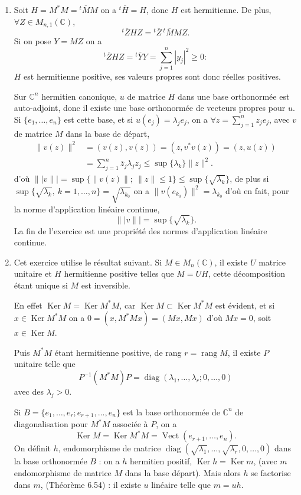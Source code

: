 \begin{enumerate}[label=\arabic*.,leftmargin=2.2em,itemsep=1.15em]
\item Soit $H=M^*M={}^t\!\overline M M$ on a ${}^t\!\overline H=H$, donc $H$ est hermitienne. De plus, $\forall Z\in M_{n,1}(\mathbb C)$,
\[
{}^t\!\overline ZHZ={}^t\!\overline Z\,{}^t\!\overline M MZ.
\]
Si on pose $Y=MZ$ on a
\[
{}^t\!\overline ZHZ={}^t\!\overline YY=\sum_{j=1}^n|y_j|^2\ge0 :
\]
$H$ est hermitienne positive, ses valeurs propres sont donc réelles positives.

Sur $\mathbb C^n$ hermitien canonique, $u$ de matrice $H$ dans une base orthonormée est auto-adjoint, donc il existe une base orthonormée de vecteurs propres pour $u$. Si $\{e_1,\ldots,e_n\}$ est cette base, et si $u(e_j)=\lambda_je_j$, on a $\forall z=\sum_{j=1}^nz_je_j$, avec $v$ de matrice $M$ dans la base de départ,
\[
\begin{aligned}
\|v(z)\|^2&=(v(z),v(z))=(z,v^*v(z))=(z,u(z))\\
&=\sum_{j=1}^n\overline z_j\lambda_jz_j
\le \sup\{\lambda_k\}\|z\|^2.
\end{aligned}
\]
d'où $\|\!|v\|\!|=\sup\{\|v(z)\|;\ \|z\|\le1\}\le\sup\{\sqrt{\lambda_k}\}$, de plus si $\sup\{\sqrt{\lambda_k},\ k=1,\ldots,n\}=\sqrt{\lambda_{k_0}}$ on a $\|v(e_{k_0})\|^2=\lambda_{k_0}$ d'où en fait, pour la norme d'application linéaire continue,
\[
\|\!|v\|\!|=\sup\{\sqrt{\lambda_k}\}.
\]
La fin de l'exercice est une propriété des normes d'application linéaire continue.

\item Cet exercice utilise le résultat suivant. Si $M\in M_n(\mathbb C)$, il existe $U$ matrice unitaire et $H$ hermitienne positive telles que $M=UH$, cette décomposition étant unique si $M$ est inversible.

En effet $\operatorname{Ker}M=\operatorname{Ker}M^*M$, car $\operatorname{Ker}M\subset\operatorname{Ker}M^*M$ est évident, et si $x\in\operatorname{Ker}M^*M$ on a $0=(x,M^*Mx)=(Mx,Mx)$ d'où $Mx=0$, soit $x\in\operatorname{Ker}M$.

Puis $M^*M$ étant hermitienne positive, de rang $r=\operatorname{rang}M$, il existe $P$ unitaire telle que
\[
P^{-1}(M^*M)P=\operatorname{diag}(\lambda_1,\ldots,\lambda_r;0,\ldots,0)
\]
avec des $\lambda_j>0$.

Si $B=\{e_1,\ldots,e_r;e_{r+1},\ldots,e_n\}$ est la base orthonormée de $\mathbb C^n$ de diagonalisation pour $M^*M$ associée à $P$, on a
\[
\operatorname{Ker}M=\operatorname{Ker}M^*M=\operatorname{Vect}(e_{r+1},\ldots,e_n).
\]
On définit $h$, endomorphisme de matrice $\operatorname{diag}(\sqrt{\lambda_1},\ldots,\sqrt{\lambda_r},0,\ldots,0)$ dans la base orthonormée $B$ : on a $h$ hermitien positif, $\operatorname{Ker}h=\operatorname{Ker}m$, (avec $m$ endomorphisme de matrice $M$ dans la base départ). Mais alors $h$ se factorise dans $m$, (Théorème 6.54) : il existe $u$ linéaire telle que $m=uh$.


\end{enumerate}
